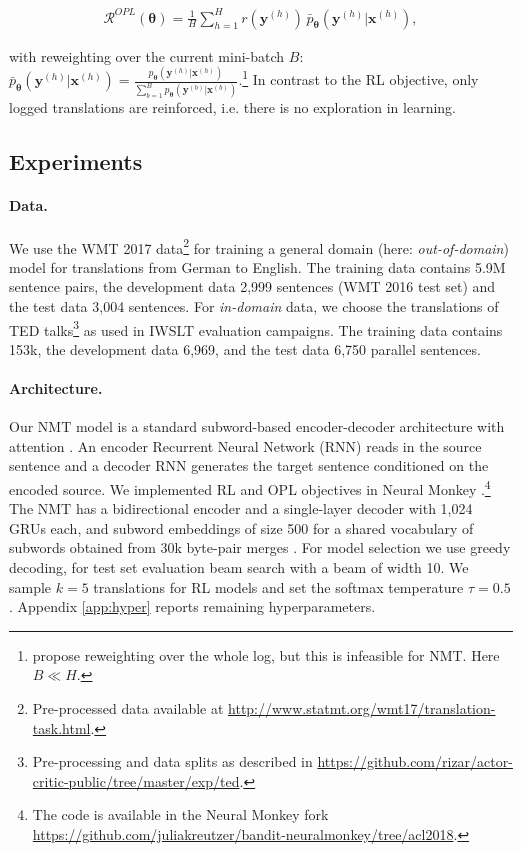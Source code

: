 \begin{align*} \label{eq:opl-loss}
\mathcal{R}^{OPL}(\boldsymbol \theta) = \frac{1}{H}\sum_{h=1}^H r(\mathbf{y}^{(h)}) \, \bar{p}_{\boldsymbol \theta}(\mathbf{y}^{(h)}|\mathbf{x}^{(h)}),
\end{align*}

with reweighting over the current mini-batch $B$: $\bar{p}_{\boldsymbol \theta}(\mathbf{y}^{(h)}|\mathbf{x}^{(h)}) =
\frac{p_{\boldsymbol \theta}(\mathbf{y}^{(h)}|\mathbf{x}^{(h)})}{\sum_{b=1}^B p_{\boldsymbol \theta}(\mathbf{y}^{(b)}|\mathbf{x}^{(b)})}$.\footnote{\citet{LawrenceETAL:17} propose reweighting over the whole log, but this is infeasible for NMT. Here $B \ll H$.} In contrast to the RL objective, only logged translations are reinforced, i.e. there is no exploration in learning.

\subsection{Experiments}\label{sec:rl-setup}

\paragraph{Data.}
We use the WMT 2017 data\footnote{Pre-processed data available at \url{http://www.statmt.org/wmt17/translation-task.html}.} for training a general domain (here: \emph{out-of-domain}) model for translations from German to English. The training data contains 5.9M sentence pairs, the development data 2,999 sentences (WMT 2016 test set) and the test data 3,004 sentences. For \emph{in-domain} data, we choose the translations of TED talks\footnote{Pre-processing and data splits as described in \url{https://github.com/rizar/actor-critic-public/tree/master/exp/ted}.} as used in IWSLT evaluation campaigns. The training data contains 153k, the development data 6,969, and the test data 6,750 parallel sentences.

\paragraph{Architecture.} Our NMT model is a standard subword-based encoder-decoder architecture with attention \cite{BahdanauETAL:15}. An encoder Recurrent Neural Network (RNN) reads in the source sentence and a decoder RNN generates the target sentence conditioned on the encoded source. We implemented RL and OPL objectives in Neural Monkey \cite{NeuralMonkey:2017}.\footnote{The code is available in the Neural Monkey fork \url{https://github.com/juliakreutzer/bandit-neuralmonkey/tree/acl2018}.} The NMT has a bidirectional encoder and a single-layer decoder with 1,024 GRUs each, and subword embeddings of size 500 for a shared vocabulary of subwords obtained from 30k byte-pair merges \cite{SennrichETAL:16}. For model selection we use greedy decoding, for test set evaluation beam search with a beam of width 10. We sample $k=5$ translations for RL models and set the softmax temperature $\tau=0.5$. Appendix \ref{app:hyper} reports remaining hyperparameters. 

